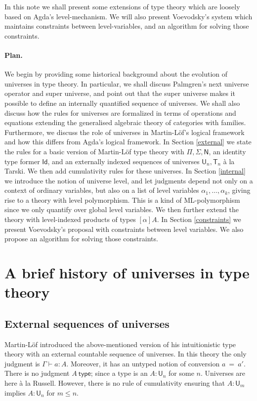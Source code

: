 \documentclass[11pt,a4paper]{article}
\newcommand{\Id}{\mathsf{Id}}
\newcommand{\conv}{=}
\def\NN{\mathsf{N}}
\def\UU{\mathsf{U}}
\newcommand{\type}{\mathsf{type}}
\newcommand{\T}{\mathsf{T}}
\begin{document}
In this note we shall present some extensions of type theory which are loosely based on Agda's level-mechanism. We will also present Voevodsky's system which maintains constraints between level-variables, and an algorithm for solving those constraints.

\paragraph{Plan.} We begin by providing some historical background about the evolution of universes in type theory. In particular, we shall discuss Palmgren's next universe operator and super universe, and point out that the super universe makes it possible to define an internally quantified sequence of universes. We shall also discuss how the rules for universes are formalized in terms of operations and equations extending the generalised algebraic theory of categories with families. Furthermore, we discuss the role of universes in Martin-Löf's logical framework and how this differs from Agda's logical framework. In Section \ref{external} we state the rules for a basic version of Martin-Löf type theory with $\Pi, \Sigma, \NN$, an identity type former $\Id$, and an externally indexed sequences of universes $\UU_n, \T_n$ \`a la Tarski. We then add cumulativity rules for these universes. In Section \ref{internal} we introduce the notion of universe level, and let judgments depend not only on a context of ordinary variables, but also on a list of level variables $\alpha_1, \ldots, \alpha_k$, giving rise to a theory with level polymorphism. This is a kind of ML-polymorphism since we only quantify over global level variables. We then further extend the theory with level-indexed products of types $[\alpha]A$. In Section \ref{constraints} we present Voevodsky's proposal with constraints between level variables. We also propose an algorithm for solving those constraints.

\section{A brief history of universes in type theory}

\subsection{External sequences of universes}\label{palmgren}

Martin-Löf \cite{martinlof:predicative} introduced the above-mentioned version of his intuitionistic type theory with an external countable sequence of universes. In this theory the only judgment is  $\Gamma \vdash a : A$. Moreover, it has an untyped notion of conversion $a\ \conv\ a'$. There is no judgment $A\ \type$; since a type is an $A : \UU_n$ for some $n$. Universes are here \`a la Russell. However, there is no rule of cumulativity ensuring that $A : \UU_m$ implies $A : \UU_n$ for $m \leq n$.
\end{document}
